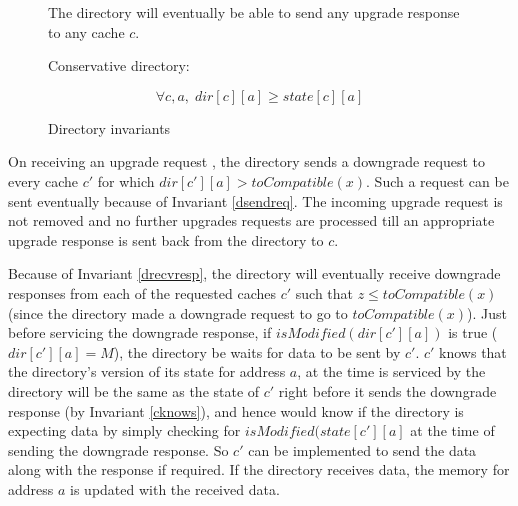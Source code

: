 \begin{figure}
\begin{inv}
The directory will eventually be able to send any upgrade response to any cache
$c$.%
\label{dsendresp}
\end{inv}
\begin{inv}
Conservative directory:
\begin{spacing}{.1}
\begin{equation*}
\forall c, a,\; dir[c][a] \ge state[c][a]
\end{equation*}
\end{spacing}
\label{conservative}
\end{inv}
\caption{Directory invariants}
\label{DirInv}
\end{figure}

On receiving an upgrade request , the directory sends a
downgrade request  to every cache $c'$
for which $dir[c'][a] > toCompatible(x)$. Such a request can be sent eventually
because of Invariant \ref{dsendreq}. The incoming upgrade request is not
removed and no further upgrades requests are processed till an appropriate
upgrade response is sent back from the directory to $c$.

Because of Invariant \ref{drecvresp}, the directory will eventually receive
downgrade responses  from each of the requested caches $c'$
such that $z \le toCompatible(x)$ (since the directory made a downgrade request
to go to $toCompatible(x)$). Just before servicing the downgrade response, if
$isModified(dir[c'][a])$ is true (\ie $dir[c'][a] = M$), the directory be
 waits for data to be sent by $c'$. $c'$ knows that the directory's
version of its state for address $a$, at the time  is
serviced by the directory will be the same as the state of $c'$ right before it
sends the downgrade response (by Invariant \ref{cknows}), and hence would know
if the directory is expecting data by simply checking for
$isModified(state[c'][a]$ at the time of sending the downgrade response. So $c'$
can be implemented to send the data along with the response if required. If the
directory receives data, the memory for address $a$ is updated with the received
data.

